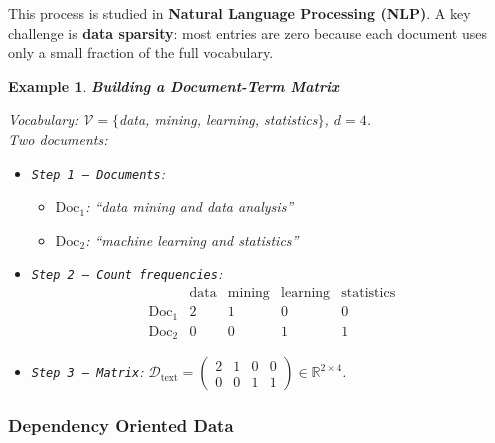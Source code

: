 \documentclass[11pt]{article}
\theoremstyle{smallexample}
\newtheorem{example}{Example}[section]
\newcommand{\vs}{\vspace{0.2\baselineskip}}
\begin{document}
    This process is studied in \textbf{Natural Language Processing (NLP)}.
    A key challenge is \textbf{data sparsity}: most entries are zero because each
    document uses only a small fraction of the full vocabulary.

\vs
\begin{example}{\textbf{Building a Document-Term Matrix}}

    Vocabulary: $\mathcal{V} = \{$data, mining, learning, statistics$\}$, $d = 4$. \\
    Two documents:
    \begin{itemize}
        \item \texttt{Step 1 -- Documents}:
        \begin{itemize}
            \item $\text{Doc}_1$: ``data mining and data analysis''
            \item $\text{Doc}_2$: ``machine learning and statistics''
        \end{itemize}

        \vspace{0.2cm}
        \item \texttt{Step 2 -- Count frequencies}:
        \[
            \begin{array}{l|cccc}
                        & \text{data} & \text{mining} & \text{learning}
                        & \text{statistics} \\ \hline
                \text{Doc}_1 & 2 & 1 & 0 & 0 \\
                \text{Doc}_2 & 0 & 0 & 1 & 1
            \end{array}
        \]

        \vspace{0.2cm}
        \item \texttt{Step 3 -- Matrix}:
        $\mathcal{D}_{\text{text}} = \begin{pmatrix} 2 & 1 & 0 & 0 \\ 0 & 0 & 1 & 1
        \end{pmatrix} \in \mathbb{R}^{2 \times 4}$.


    \end{itemize}
\end{example}


\subsubsection{Dependency Oriented Data}
\end{document}
